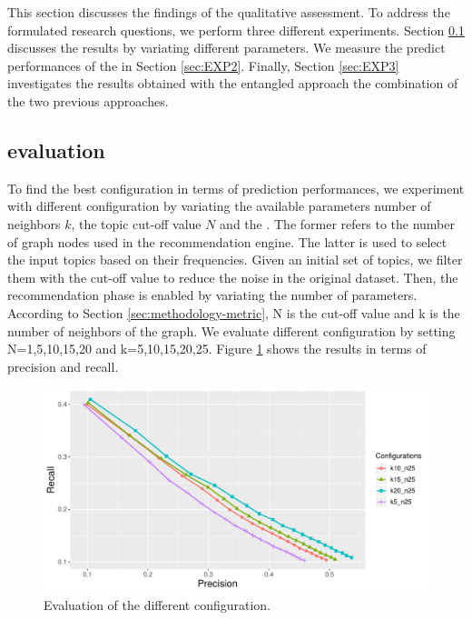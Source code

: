 This section discusses the findings of the qualitative assessment. To address the formulated research questions, we perform three different experiments. Section \ref{sec:EXP1} discusses the \CT results by variating different parameters.  We measure the predict performances of the \MNB in Section \ref{sec:EXP2}. Finally, Section \ref{sec:EXP3} investigates the results obtained with the entangled approach \ie the combination of the two previous approaches. 


\subsection{\CT evaluation} \label{sec:EXP1}
 \rqfirst
To find the best configuration in terms of prediction performances, we experiment with different \CT configuration by variating the available parameters \ie number of neighbors $k$, the topic cut-off value $N$ and the .  The former refers to the number of graph nodes used in the recommendation engine. The latter is used to select the input topics based on their frequencies. Given an initial set of topics, we filter them with the cut-off value to reduce the noise in the original dataset. Then, the recommendation phase is enabled by variating the number of parameters. According to Section \ref{sec:methodology-metric}, N is the cut-off value and k is the number of neighbors of the graph. We evaluate different configuration by setting N=1,5,10,15,20 and k=5,10,15,20,25. Figure \ref{fig:configs} shows the results  in terms of precision and recall. 


\begin{figure}[t!]
	\centering
	\includegraphics[width=\linewidth]{figs/PrecisionRecallCurve.pdf}
	\caption{Evaluation of the different configuration.}
	\label{fig:configs}
\end{figure}


